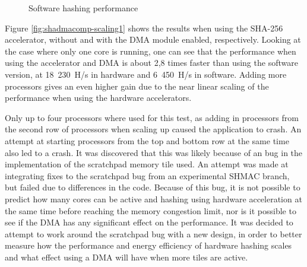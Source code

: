 \begin{figure}
	\centering
	\caption{Software hashing performance}
	\label{fig:sw-scaling1}
\end{figure}

Figure \ref{fig:shadmacomp-scaling1} shows the results when using the SHA-256 accelerator, without and with the DMA module enabled, respectively.
Looking at the case where only one core is running, one can see that the performance when using the accelerator and DMA is about 2,8 times faster than
using the software version, at 18~230~H/s in hardware and 6~450~H/s in software. Adding more processors gives an even higher gain due to the
near linear scaling of the performance when using the hardware accelerators.

Only up to four processors where used for this test, as adding in processors from the second row of processors when scaling up caused the application to crash.
An attempt at starting processors from the top and bottom row at the same time also led to a crash.
It was discovered that this was likely because of an bug in the implementation of the scratchpad memory tile used. An attempt was made at integrating fixes
to the scratchpad bug from an experimental SHMAC branch, but failed due to differences in the code. Because of this bug, it is not
possible to predict how many cores can be active and hashing using hardware acceleration at the same time before reaching the memory congestion limit,
nor is it possible to see if the DMA has any significant effect on the performance. It was decided to attempt to work around the scratchpad bug with
a new design, in order to better measure how the performance and energy efficiency of hardware hashing scales and what effect using a DMA will have when more tiles are active.


